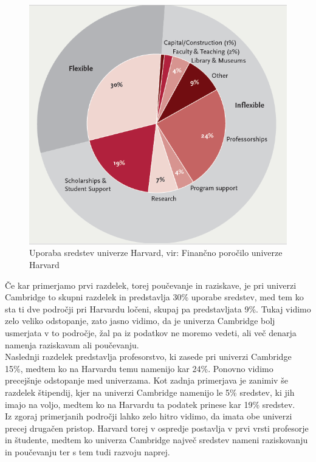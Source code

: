 \documentclass[12pt, a4paper]{article}
\begin{document}
\begin{figure}[!h]
\centering
\includegraphics[width = 12 cm]{slike/harvard.png}
\caption{Uporaba sredstev univerze Harvard, vir: Finančno poročilo univerze Harvard}
\label{Slika 4}
\end{figure}


Če kar primerjamo prvi razdelek, torej poučevanje in raziskave, je pri univerzi Cambridge to skupni razdelek in predstavlja 30\% uporabe sredstev, med tem ko sta ti dve področji pri Harvardu ločeni, skupaj pa predstavljata 9\%. Tukaj vidimo zelo veliko odstopanje, zato jasno vidimo, da je univerza Cambridge bolj usmerjata v to področje, žal pa iz podatkov ne moremo vedeti, ali več denarja namenja raziskavam ali poučevanju. \\

Naslednji razdelek predstavlja profesorstvo, ki zasede pri univerzi Cambridge 15\%, medtem ko na Harvardu temu namenijo kar 24\%. Ponovno vidimo precejšnje odstopanje med univerzama. Kot zadnja primerjava je zanimiv še razdelek štipendij, kjer na univerzi Cambridge namenijo le 5\% sredstev, ki jih imajo na voljo, medtem ko na Harvardu ta podatek prinese kar 19\% sredstev. \\

Iz zgoraj primerjanih področji lahko zelo hitro vidimo, da imata obe univerzi precej drugačen pristop. Harvard torej v ospredje postavlja v prvi vrsti profesorje in študente, medtem ko univerza Cambridge največ sredstev nameni raziskovanju in poučevanju ter s tem tudi razvoju naprej. 
\end{document}
